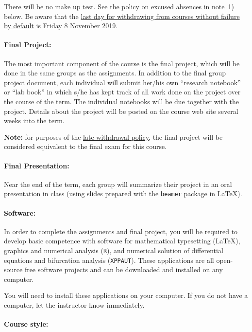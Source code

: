 \documentclass[12pt]{article}
\begin{document}
There will be no make up test. See the policy on excused absences in
note~1) below.  Be aware that the
\href{https://academiccalendars.romcmaster.ca/content.php?catoid=38&navoid=8059}{last
  day for withdrawing from courses without failure by default} is
Friday 8 November 2019.

\paragraph*{Final Project:}

The most important component of the course is the final project, which
will be done in the same groups as the assignments.  In addition to
the final group project document, each individual will submit her/his
own ``research notebook'' or ``lab book'' in which s/he has kept track
of all work done on the project over the course of the term.  The
individual notebooks will be due together with the project.  Details
about the project will be posted on the course web site several weeks
into the term.

\textbf{Note:} for purposes of the \href{https://academiccalendars.romcmaster.ca/content.php?catoid=38&navoid=8043#late_withdrawal}{late withdrawal policy}, the final project will be considered equivalent to the final exam for this course.

\paragraph*{Final Presentation:}
Near the end of the term, each group will summarize their project in an oral presentation in class (using slides prepared with the {\tt beamer} package in \LaTeX).

\paragraph*{Software:} In order to complete the assignments and final project, you will be required to develop basic competence with software for mathematical typesetting (\LaTeX), graphics and numerical analysis ({\tt R}), and numerical solution of differential equations and bifurcation analysis ({\tt XPPAUT}).  These applications are all open-source free software projects and can be downloaded and installed on any computer.

\noindent You will need to install these applications on your computer.  If you do not have a computer, let the instructor know immediately.

\paragraph*{Course style:}
\end{document}
